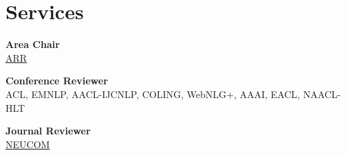 
\section{\sc Services}

{\bf Area Chair} \\
\href{https://aclrollingreview.org}{ARR}

{\bf Conference Reviewer} \\
ACL,
EMNLP,
AACL-IJCNLP,
COLING,
WebNLG+,
AAAI,
EACL,
NAACL-HLT

{\bf Journal Reviewer} \\
\href{https://www.journals.elsevier.com/neurocomputing}{NEUCOM}

